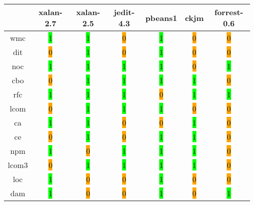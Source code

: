 \begin{table}[H]
\centering
    \begin{tabular}{|c|c|c|c|c|c|c|}
        \hline
         & xalan-2.7 & xalan-2.5 & jedit-4.3 & pbeans1 & ckjm & forrest-0.6 \\ \hline
        \acrshort{wmc} & \colorbox{lime}{1} & \colorbox{lime}{1} & \colorbox{orange}{0} & \colorbox{lime}{1} & \colorbox{orange}{0} & \colorbox{orange}{0} \\ \hline
        \acrshort{dit} & \colorbox{orange}{0} & \colorbox{lime}{1} & \colorbox{orange}{0} & \colorbox{lime}{1} & \colorbox{orange}{0} & \colorbox{orange}{0} \\ \hline
        \acrshort{noc} & \colorbox{lime}{1} & \colorbox{lime}{1} & \colorbox{lime}{1} & \colorbox{lime}{1} & \colorbox{orange}{0} & \colorbox{lime}{1} \\ \hline
        \acrshort{cbo} & \colorbox{orange}{0} & \colorbox{lime}{1} & \colorbox{lime}{1} & \colorbox{lime}{1} & \colorbox{lime}{1} & \colorbox{orange}{0} \\ \hline
        \acrshort{rfc} & \colorbox{lime}{1} & \colorbox{lime}{1} & \colorbox{lime}{1} & \colorbox{orange}{0} & \colorbox{lime}{1} & \colorbox{lime}{1} \\ \hline
        \acrshort{lcom} & \colorbox{orange}{0} & \colorbox{lime}{1} & \colorbox{lime}{1} & \colorbox{lime}{1} & \colorbox{orange}{0} & \colorbox{orange}{0} \\ \hline
        \acrshort{ca} & \colorbox{lime}{1} & \colorbox{lime}{1} & \colorbox{orange}{0} & \colorbox{orange}{0} & \colorbox{lime}{1} & \colorbox{orange}{0} \\ \hline
        \acrshort{ce} & \colorbox{orange}{0} & \colorbox{lime}{1} & \colorbox{orange}{0} & \colorbox{lime}{1} & \colorbox{lime}{1} & \colorbox{orange}{0} \\ \hline
        \acrshort{npm} & \colorbox{lime}{1} & \colorbox{orange}{0} & \colorbox{lime}{1} & \colorbox{lime}{1} & \colorbox{lime}{1} & \colorbox{orange}{0} \\ \hline
        \acrshort{lcom3} & \colorbox{orange}{0} & \colorbox{lime}{1} & \colorbox{lime}{1} & \colorbox{lime}{1} & \colorbox{lime}{1} & \colorbox{orange}{0} \\ \hline
        \acrshort{loc} & \colorbox{lime}{1} & \colorbox{orange}{0} & \colorbox{orange}{0} & \colorbox{lime}{1} & \colorbox{orange}{0} & \colorbox{orange}{0} \\ \hline
        \acrshort{dam} & \colorbox{lime}{1} & \colorbox{orange}{0} & \colorbox{orange}{0} & \colorbox{lime}{1} & \colorbox{orange}{0} & \colorbox{lime}{1} \\ \hline

\end{tabular}
\end{table}
